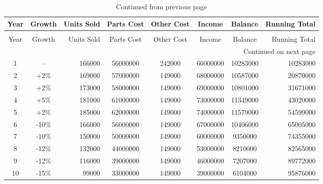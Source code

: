 {
\small
\begin{longtable}[c]{|c|c|r|c|c|c|c|r|}
\caption{Ten-Year Financial Forecast\label{ten_year_forecast.tex}}\\
\hline
\rowcolor{lightgray}
Year & Growth & Units Sold & Parts Cost & Other Cost & Income & Balance & Running Total \\ \hline\hline
\hline
\endfirsthead

\caption[]{Continued from previous page}\\
\hline
\rowcolor{lightgray}
 Year & Growth & Units Sold & Parts Cost & Other Cost & Income & Balance & Running Total \\ \hline\hline
\hline
\endhead

\multicolumn{8}{r}{{Continued on next page}} \\
\endfoot

\endlastfoot


1 & -- & 166000 & 56000000 & 242000 & 66000000 & 10283000 & 10283000 \\
2 & +2\% & 169000 & 57000000 & 149000 & 68000000 & 10587000 & 20870000 \\
3 & +2\% & 173000 & 58000000 & 149000 & 69000000 & 10801000 & 31671000 \\
4 & +5\% & 181000 & 61000000 & 149000 & 73000000 & 11349000 & 43020000 \\
5 & +2\% & 185000 & 62000000 & 149000 & 74000000 & 11579000 & 54599000 \\
6 & -10\% & 166000 & 56000000 & 149000 & 67000000 & 10406000 & 65005000 \\
7 & -10\% & 150000 & 50000000 & 149000 & 60000000 & 9350000 & 74355000 \\
8 & -12\% & 132000 & 44000000 & 149000 & 53000000 & 8210000 & 82565000 \\
9 & -12\% & 116000 & 39000000 & 149000 & 46000000 & 7207000 & 89772000 \\
10 & -15\% & 99000 & 33000000 & 149000 & 39000000 & 6104000 & 95876000 \\
\hline
\end{longtable}
}